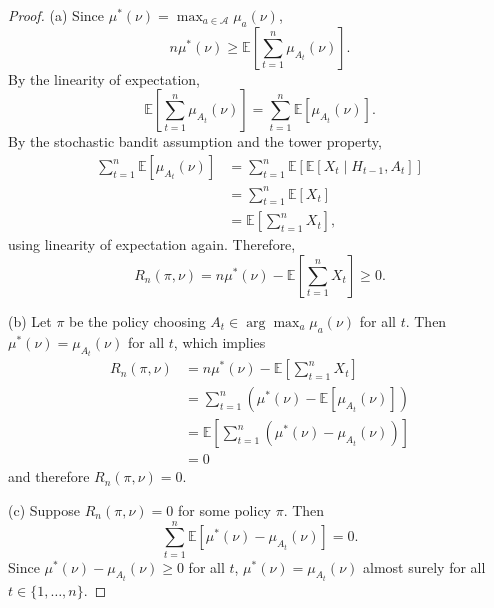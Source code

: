 \documentclass[10pt]{article}
\theoremstyle{definition}
\begin{document}
\begin{proof}
    (a) Since $\mu^*(\nu) = \max_{a \in \mathcal{A}} \mu_a(\nu)$,
    \begin{equation*}
        n \mu^*(\nu) \geq \mathbb{E} \left[ \sum_{t=1}^n \mu_{A_t}(\nu) \right].
    \end{equation*}
    By the linearity of expectation,
    \begin{equation*}
        \mathbb{E} \left[ \sum_{t=1}^n \mu_{A_t}(\nu) \right] = \sum_{t=1}^n \mathbb{E}\left[\mu_{A_t}(\nu)\right].
    \end{equation*}
    By the stochastic bandit assumption and the tower property,
    \begin{align*}
        \sum_{t=1}^n \mathbb{E}\left[\mu_{A_t}(\nu)\right] &= \sum_{t=1}^n \mathbb{E}\left[\mathbb{E}\left[X_t \mid H_{t-1}, A_t\right]\right] \\
        &= \sum_{t=1}^n \mathbb{E}\left[X_t\right] \\
        &= \mathbb{E}\left[\sum_{t=1}^n X_t\right],
    \end{align*}
    using linearity of expectation again. Therefore,
    \begin{equation*}
        R_n(\pi, \nu) = n \mu^*(\nu) - \mathbb{E}\left[\sum_{t=1}^n X_t\right] \geq 0.
    \end{equation*}

    (b) Let $\pi$ be the policy choosing $A_t \in \arg\max_a \mu_a(\nu)$ for all $t$. Then $\mu^*(\nu) = \mu_{A_t}(\nu)$ for all $t$, which implies
    \begin{align*}
        R_n(\pi, \nu) &= n \mu^*(\nu) - \mathbb{E}\left[\sum_{t=1}^n X_t\right] \\
        &= \sum_{t=1}^n \left(\mu^*(\nu) - \mathbb{E}\left[\mu_{A_t}(\nu)\right]\right) \\
        &= \mathbb{E}\left[\sum_{t=1}^n \left( \mu^*(\nu) - \mu_{A_t}(\nu)\right) \right] \\
        &= 0
    \end{align*}
    and therefore $R_n(\pi, \nu) = 0$.

    (c) Suppose $R_n(\pi, \nu) = 0$ for some policy $\pi$. Then
    \begin{equation*}
        \sum_{t=1}^n \mathbb{E}\left[\mu^*(\nu) - \mu_{A_t}(\nu)\right] = 0.
    \end{equation*}
    Since $\mu^*(\nu) - \mu_{A_t}(\nu) \geq 0$ for all $t$, $\mu^*(\nu) = \mu_{A_t}(\nu)$ almost surely for all $t \in \{1, \ldots, n\}$.

\end{proof}
\end{document}
